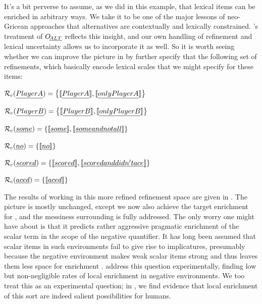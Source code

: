\documentclass[leqno,12pt]{article}
\begin{document}
It's a bit perverse to assume, as we did in this example, that lexical
items can be enriched in arbitrary ways. We take it to be one of the
major lessons of neo-Gricean approaches that alternatives are
contextually and lexically constrained. \CFS's treatment of $\mathop{O\negthinspace_{\emph{ALT}}}$
reflects this insight, and our own handling of refinement and lexical
uncertainty allows us to incorporate it as well. So it is worth seeing
whether we can improve the picture in  by further
specify that the following set of refinements, which basically encode
lexical scales that we might specify for these items:
%
\begin{examples}
\item\label{neo}
  \begin{examples}
  \item $\mathcal{R}_{c}(\emph{Player A}) = \left\{ \llbracket\emph{Player A}\rrbracket, \llbracket\emph{only Player A}\rrbracket \right\}$
  \item $\mathcal{R}_{c}(\emph{Player B}) = \left\{ \llbracket\emph{Player B}\rrbracket, \llbracket\emph{only Player B}\rrbracket \right\}$
  \item $\mathcal{R}_{c}(\emph{some}) = \left\{ \llbracket\emph{some}\rrbracket, \llbracket\emph{some and not all}\rrbracket \right\}$
  \item $\mathcal{R}_{c}(\emph{no}) = \left\{ \llbracket\emph{no}\rrbracket \right\}$    
  \item $\mathcal{R}_{c}(\emph{scored}) = \left\{ \llbracket\emph{scored}\rrbracket, \llbracket\emph{scored and didn't ace}\rrbracket \right\}$
  \item $\mathcal{R}_{c}(\emph{aced}) = \left\{ \llbracket\emph{aced}\rrbracket \right\}$
  \end{examples}
\end{examples}
%
The results of working in this more refined refinement space are given
in . The picture is mostly unchanged,
except we now also achieve the target enrichment for , and the messiness surrounding  is
fully addressed. The only worry one might have about
 is that it predicts rather aggressive
pragmatic enrichment of the scalar term in the scope of the negative
quantifier. It has long been assumed that scalar items in such
environments fail to give rise to implicatures, presumably because the
negative environment makes weak scalar items strong and thus leaves
them less space for enrichment
\citep{Levinson00}. \citet{Chemla:Spector:2011} address this question
experimentally, finding low but non-negligible rates of local
enrichment in negative environments. We too treat this as an
experimental question; in , we find evidence that
local enrichment of this sort are indeed salient possibilities for
humans.
\end{document}
